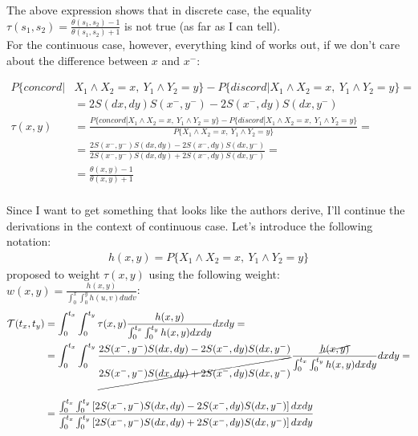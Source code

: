 \documentclass[]{article}
\begin{document}
The above expression shows that in discrete case, the equality $\tau(s_1, s_2) = \frac{\theta(s_1, s_2) - 1}{\theta(s_1, s_2) + 1}$ is not true (as far as I can tell).
~\\
For the continuous case, however, everything kind of works out, if we don't care about the difference between $x$ and $x^-$:

  $$
  \begin{aligned}
    P\{concord| &X_{1}\wedge X_{2} = x,~Y_{1}\wedge Y_{2} = y\} - P\{discord|X_{1}\wedge X_{2} = x,~Y_{1}\wedge Y_{2} = y\} =\\
    &= 2S(dx,dy) S(x^-,y^-) - 2S(x^-,dy)S(dx,y^-)\\
    \tau(x, y) &= \frac{P\{concord| X_{1}\wedge X_{2} = x,~Y_{1}\wedge Y_{2} = y\} - P\{discord|X_{1}\wedge X_{2} = x,~Y_{1}\wedge Y_{2} = y\}}{P\{X_{1}\wedge X_{2} = x,~Y_{1}\wedge Y_{2} = y\}} = \\
     &= \frac{2S(x^-,y^-)S(dx,dy) - 2 S(x^-, dy)S(dx, y^-) }{ 2 S(x^-, y^-) S(dx, dy) + 2 S(x^-, dy) S(dx, y^-) } =\\
     &= \frac{\theta(x, y) - 1}{\theta(x, y) + 1}
  \end{aligned}
  $$
  ~\\

Since I want to get something that looks like the authors derive, I'll continue the derivations in the context of continuous case. Let's introduce the following notation:
	$$
	\begin{aligned}
		h(x, y) = P\{X_{1}\wedge X_{2} = x,~Y_{1}\wedge Y_{2} = y\}
	\end{aligned}
	$$
\cite{fan2000class} proposed to weight $\tau(x, y)$ using the following weight: $w(x, y) = \frac{h(x, y)}{\int_0^x \int_0^y h(u, v) dudv}$: 
	$$
	\begin{aligned}
		\mathcal{T}(t_x, t_y) &= \int_0^{t_x} \int_0^{t_y}  \tau(x, y)\frac{h(x, y)}{\int_0^{t_x} \int_0^{t_y} h(x, y) dxdy} dxdy = \\
    &= \int_0^{t_x} \int_0^{t_y}  \frac{2S(x^-,y^-)S(dx,dy) - 2 S(x^-, dy)S(dx, y^-)     }{ \cancel{2 S(x^-, y^-) S(dx, dy) + 2 S(x^-, dy) S(dx, y^-) }} \frac{\cancel{h(x, y)}}{\int_0^{t_x} \int_0^{t_y} h(x, y) dxdy} dxdy = \\
    ~\\
    &= \frac{\int_0^{t_x} \int_0^{t_y}  \left[   2S(x^-,y^-)S(dx,dy) - 2 S(x^-, dy)S(dx, y^-)  \right]   dxdy }{  \int_0^{t_x} \int_0^{t_y} \left[2 S(x^-, y^-) S(dx, dy) + 2 S(x^-, dy) S(dx, y^-) \right]dxdy }\\
	\end{aligned}
	$$
\end{document}

